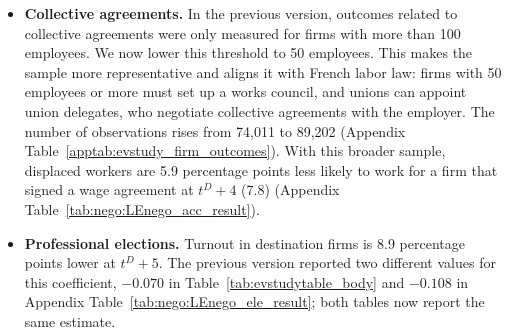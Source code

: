 \documentclass[11pt]{article}
\begin{document}
{\begin{itemize}[leftmargin=*]
\item \textbf{Collective agreements.} In the previous version, outcomes related to collective agreements were only measured for firms with more than 100 employees. We now lower this threshold to 50 employees. This makes the sample more representative and aligns it with French labor law: firms with 50 employees or more must set up a works council, and unions can appoint union delegates, who negotiate collective agreements with the employer. The number of observations rises from 74,011 to 89,202 (Appendix Table~\ref{apptab:evstudy_firm_outcomes}). With this broader sample, displaced workers are 5.9 percentage points less likely to work for a firm that signed a wage agreement at $t^D+4$ (7.8) (Appendix Table~\ref{tab:nego:LEnego_acc_result}).

\item \textbf{Professional elections.} Turnout in destination firms is 8.9 percentage points lower at $t^D+5$. The previous version reported two different values for this coefficient, $-0.070$ in Table~\ref{tab:evstudytable_body} and $-0.108$ in Appendix Table~\ref{tab:nego:LEnego_ele_result}; both tables now report the same estimate.
\end{itemize}}\par 
\end{document}
